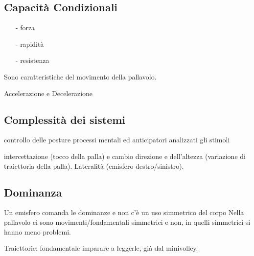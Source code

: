 \subsection{Capacità Condizionali}
\begin{itemize}
\item[-]forza
\item[-]rapidità
\item[-]resistenza
\end{itemize}
Sono caratteristiche del movimento della pallavolo.

Accelerazione e Decelerazione

\subsection{Complessità dei sistemi}
controllo delle posture
processi mentali ed anticipatori analizzati gli stimoli

intercettazione (tocco della palla) e cambio direzione e dell'altezza (variazione di traiettoria della palla). Lateralità (emisfero destro/sinistro).

\subsection{Dominanza}
Un emisfero comanda le dominanze e non c'è un uso simmetrico del corpo
Nella pallavolo ci sono movimenti/fondamentali simmetrici e non, in quelli simmetrici si hanno meno problemi.

Traiettorie: fondamentale imparare a leggerle, già dal minivolley.

